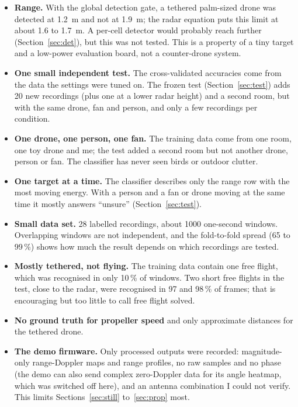 \documentclass[11pt,a4paper]{article}
\begin{document}
\begin{itemize}
\item \textbf{Range.} With the global detection gate, a tethered palm-sized drone was detected at \SI{1.2}{m} and not at \SI{1.9}{m}; the radar equation puts this limit at about 1.6 to \SI{1.7}{m}. A per-cell detector would probably reach further (Section~\ref{sec:det}), but this was not tested. This is a property of a tiny target and a low-power evaluation board, not a counter-drone system.
\item \textbf{One small independent test.} The cross-validated accuracies come from the data the settings were tuned on. The frozen test (Section~\ref{sec:test}) adds 20 new recordings (plus one at a lower radar height) and a second room, but with the same drone, fan and person, and only a few recordings per condition.
\item \textbf{One drone, one person, one fan.} The training data come from one room, one toy drone and me; the test added a second room but not another drone, person or fan. The classifier has never seen birds or outdoor clutter.
\item \textbf{One target at a time.} The classifier describes only the range row with the most moving energy. With a person and a fan or drone moving at the same time it mostly answers ``unsure'' (Section~\ref{sec:test}).
\item \textbf{Small data set.} 28 labelled recordings, about 1000 one-second windows. Overlapping windows are not independent, and the fold-to-fold spread (65 to 99\,\%) shows how much the result depends on which recordings are tested.
\item \textbf{Mostly tethered, not flying.} The training data contain one free flight, which was recognised in only 10\,\% of windows. Two short free flights in the test, close to the radar, were recognised in 97 and 98\,\% of frames; that is encouraging but too little to call free flight solved.
\item \textbf{No ground truth for propeller speed} and only approximate distances for the tethered drone.
\item \textbf{The demo firmware.} Only processed outputs were recorded: magnitude-only range-Doppler maps and range profiles, no raw samples and no phase (the demo can also send complex zero-Doppler data for its angle heatmap, which was switched off here), and an antenna combination I could not verify. This limits Sections~\ref{sec:still} to~\ref{sec:prop} most.
\end{itemize}
\end{document}
